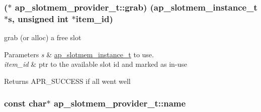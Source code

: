 \subsubsection[{\texorpdfstring{grab}{grab}}]{($\ast$  ap\+\_\+slotmem\+\_\+provider\+\_\+t\+::grab) ({\bf ap\+\_\+slotmem\+\_\+instance\+\_\+t} $\ast${\bf s}, unsigned {\bf int} $\ast$item\+\_\+id)}\hypertarget{structap__slotmem__provider__t_a7a27f500f0f372da2fc85f792a0e3ab0}{}\label{structap__slotmem__provider__t_a7a27f500f0f372da2fc85f792a0e3ab0}
grab (or alloc) a free slot 
\begin{DoxyParams}{Parameters}
{\em s} & \hyperlink{structap__slotmem__instance__t}{ap\+\_\+slotmem\+\_\+instance\+\_\+t} to use. \\
\hline
{\em item\+\_\+id} & ptr to the available slot id and marked as in-\/use \\
\hline
\end{DoxyParams}
\begin{DoxyReturn}{Returns}
A\+P\+R\+\_\+\+S\+U\+C\+C\+E\+SS if all went well 
\end{DoxyReturn}
\subsubsection[{\texorpdfstring{name}{name}}]{\setlength{\rightskip}{0pt plus 5cm}const char$\ast$ ap\+\_\+slotmem\+\_\+provider\+\_\+t\+::name}\hypertarget{structap__slotmem__provider__t_af16641b9117b0181ea1224515dd15b73}{}\label{structap__slotmem__provider__t_af16641b9117b0181ea1224515dd15b73}
